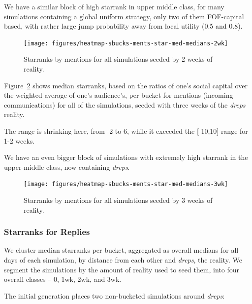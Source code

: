 \documentclass[10pt,oneside]{memoir}
\begin{document}
We have a similar block of high starrank in upper middle class, for many simulations containing a global uniform strategy, only two of them FOF-capital based, with rather large jump probability away from local utility (0.5 and 0.8).



\begin{figure}
\begin{center}
    \texttt{[image: figures/heatmap-sbucks-ments-star-med-medians-2wk]}
    \caption{Starranks by mentions for all simulations seeded by 2 weeks of reality.}
    \label{figure:heatmap-sbucks-ments-star-med-medians-2wk}
\end{center}
\end{figure}
Figure~\ref{figure:heatmap-sbucks-ments-star-med-medians-3wk} shows median starranks, based on the ratios of one's social capital over the weighted average of one's audience's, per-bucket for mentions (incoming communications) for all of the simulations, seeded with three weeks of the {\itshape dreps} reality.


The range is shrinking here, from -2 to 6, while it exceeded the [-10,10] range for 1-2 weeks.


We have an even bigger block of simulations with extremely high starrank in the upper-middle class, now containing {\itshape dreps}.



\begin{figure}
\begin{center}
    \texttt{[image: figures/heatmap-sbucks-ments-star-med-medians-3wk]}
    \caption{Starranks by mentions for all simulations seeded by 3 weeks of reality.}
    \label{figure:heatmap-sbucks-ments-star-med-medians-3wk}
\end{center}
\end{figure}
\pagebreak \subsubsection{Starranks for Replies}
\label{starranksforreplies}

We cluster median starranks per bucket, aggregated as overall medians for all days of each simulation, by distance from each other and {\itshape dreps}, the reality.  We segment the simulations by the amount of reality used to seed them, into four overall classes -- 0, 1wk, 2wk, and 3wk.


The initial generation places two non-bucketed simulations around {\itshape dreps}:
\end{document}
